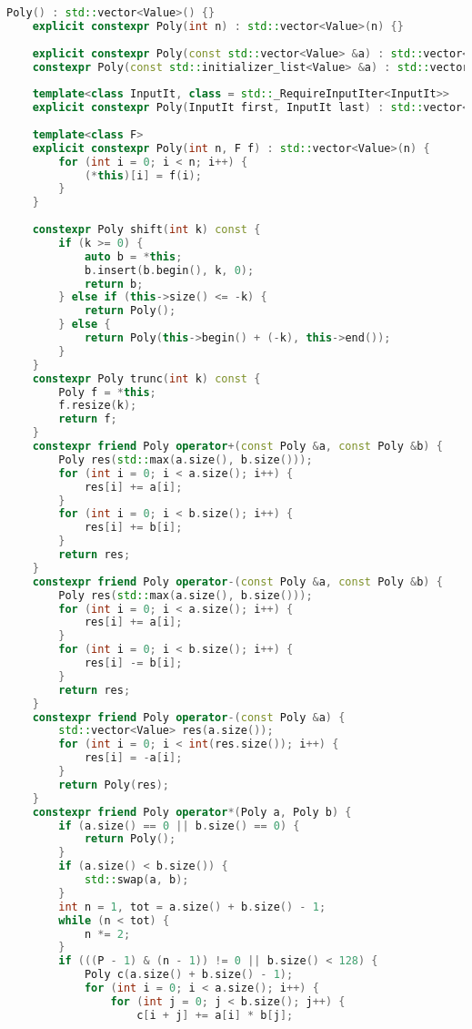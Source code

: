 \begin{lstlisting}[language=c++]
    Poly() : std::vector<Value>() {}
    explicit constexpr Poly(int n) : std::vector<Value>(n) {}
     
    explicit constexpr Poly(const std::vector<Value> &a) : std::vector<Value>(a) {}
    constexpr Poly(const std::initializer_list<Value> &a) : std::vector<Value>(a) {}
     
    template<class InputIt, class = std::_RequireInputIter<InputIt>>
    explicit constexpr Poly(InputIt first, InputIt last) : std::vector<Value>(first, last) {}
     
    template<class F>
    explicit constexpr Poly(int n, F f) : std::vector<Value>(n) {
        for (int i = 0; i < n; i++) {
            (*this)[i] = f(i);
        }
    }
     
    constexpr Poly shift(int k) const {
        if (k >= 0) {
            auto b = *this;
            b.insert(b.begin(), k, 0);
            return b;
        } else if (this->size() <= -k) {
            return Poly();
        } else {
            return Poly(this->begin() + (-k), this->end());
        }
    }
    constexpr Poly trunc(int k) const {
        Poly f = *this;
        f.resize(k);
        return f;
    }
    constexpr friend Poly operator+(const Poly &a, const Poly &b) {
        Poly res(std::max(a.size(), b.size()));
        for (int i = 0; i < a.size(); i++) {
            res[i] += a[i];
        }
        for (int i = 0; i < b.size(); i++) {
            res[i] += b[i];
        }
        return res;
    }
    constexpr friend Poly operator-(const Poly &a, const Poly &b) {
        Poly res(std::max(a.size(), b.size()));
        for (int i = 0; i < a.size(); i++) {
            res[i] += a[i];
        }
        for (int i = 0; i < b.size(); i++) {
            res[i] -= b[i];
        }
        return res;
    }
    constexpr friend Poly operator-(const Poly &a) {
        std::vector<Value> res(a.size());
        for (int i = 0; i < int(res.size()); i++) {
            res[i] = -a[i];
        }
        return Poly(res);
    }
    constexpr friend Poly operator*(Poly a, Poly b) {
        if (a.size() == 0 || b.size() == 0) {
            return Poly();
        }
        if (a.size() < b.size()) {
            std::swap(a, b);
        }
        int n = 1, tot = a.size() + b.size() - 1;
        while (n < tot) {
            n *= 2;
        }
        if (((P - 1) & (n - 1)) != 0 || b.size() < 128) {
            Poly c(a.size() + b.size() - 1);
            for (int i = 0; i < a.size(); i++) {
                for (int j = 0; j < b.size(); j++) {
                    c[i + j] += a[i] * b[j];

\end{lstlisting}
